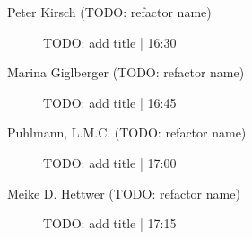 \begin{symposium}
\begin{description}
                \item [Peter Kirsch  (TODO: refactor name)] TODO: add title \textcolor{mygray}{ | 16:30}    
                
                \item [Marina Giglberger (TODO: refactor name)] TODO: add title \textcolor{mygray}{ | 16:45}    
                
                \item [Puhlmann, L.M.C. (TODO: refactor name)] TODO: add title \textcolor{mygray}{ | 17:00}    
                
                \item [Meike D. Hettwer (TODO: refactor name)] TODO: add title \textcolor{mygray}{ | 17:15}    
                
            \end{description} 
            \end{symposium}
            